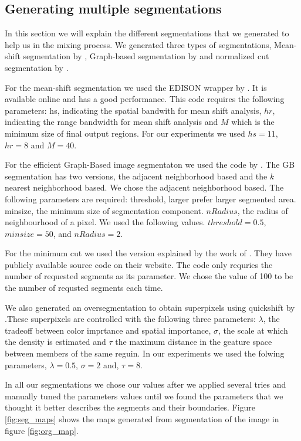 \documentclass[twoside,11pt]{article}
\begin{document}
\subsection{Generating multiple segmentations}

In this section we will explain the different segmentations that we generated to
help us in the mixing process. We generated three types of segmentations,
Mean-shift segmentation by \cite{Comaniciu02meanshift}, Graph-based segmentation
by \cite{Felzenszwalb04efficientgraph-based} and normalized cut segmentation by
\cite{Shi_2000_3808}.

For the mean-shift segmentation we used the EDISON wrapper by
\cite{Christoudias02synergismin}. It is available online and has a good
performance. This code requires the following parameters: hs, indicating the
spatial bandwith for mean shift analysis, $hr$, indicating the range bandwidth
for mean shift analysis and $M$ which is the minimum size of final output regions.
For our experiments we used $hs = 11$, $hr = 8$ and $M = 40$.

For the efficient Graph-Based image segmentaton we used the code by
\cite{Felzenszwalb04efficientgraph-based}. The GB segmentation has two versions,
the adjacent neighborhood based and the $k$ nearest neighborhood based. We chose
the adjacent neighborhood based.
The following parameters are required: threshold, larger prefer larger segmented
area. minsize, the minimum size of segmentation component. $nRadius$, the radius
of neighbourhood of a pixel. We used the following values. $threshold = 0.5$,
$minsize = 50$, and $nRadius = 2$.

For the minimum cut we used the version explained by the work of \cite{1069213}.
They have publicly available source code on their website. The code only
requries the number of requested segments as its parameter. We chose the value of
100 to be the number of requsted segments each time.

We also generated an oversegmentation to obtain superpixels using quickshift by
\cite{vedaldi08quick}.These superpixels are controlled with the following three
parameters: $\lambda$, the tradeoff between color imprtance and spatial
importance, $\sigma$, the scale at which the density is estimated and $\tau$ the
maximum distance in the geature space between members of the same reguin. In our
experiments we used the folwing parameters, $\lambda = 0.5$, $\sigma = 2$ and,
$\tau = 8$.

In all our segmentations we chose our values after we applied several tries and
manually tuned the parameters values until we found the parameters that we
thought it better describes the segments and their boundaries. Figure
\ref{fig:seg_maps} shows the maps generated from segmentation of the
image in figure \ref{fig:org_map}.
\end{document}
